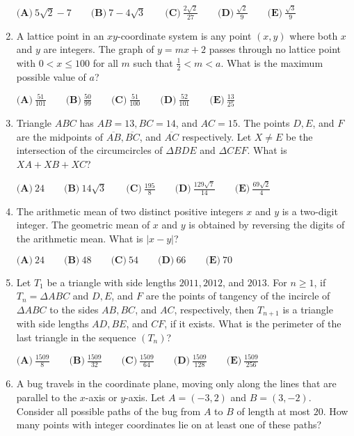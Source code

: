 \documentclass{article}
\begin{document}
\begin{enumerate}[label=\arabic*., itemsep=0.5em]
$\textbf{(A)}\ 5\sqrt{2} - 7 \qquad \textbf{(B)}\ 7 - 4\sqrt{3} \qquad \textbf{(C)}\ \frac{2\sqrt{2}}{27} \qquad \textbf{(D)}\ \frac{\sqrt{2}}{9} \qquad \textbf{(E)}\ \frac{\sqrt{3}}{9}$\par \vspace{0.5em}\item A lattice point in an $xy$-coordinate system is any point $(x, y)$ where both $x$ and $y$ are integers. The graph of $y = mx + 2$ passes through no lattice point with $0 < x \leq 100$ for all $m$ such that $\frac{1}{2} < m < a$. What is the maximum possible value of $a$?

$\textbf{(A)}\ \frac{51}{101} \qquad \textbf{(B)}\ \frac{50}{99} \qquad \textbf{(C)}\ \frac{51}{100} \qquad \textbf{(D)}\ \frac{52}{101} \qquad \textbf{(E)}\ \frac{13}{25}$\par \vspace{0.5em}\item Triangle $ABC$ has $AB = 13, BC = 14$, and $AC = 15$. The points $D, E$, and $F$ are the midpoints of $\overline{AB}, \overline{BC}$, and $\overline{AC}$ respectively. Let $X \not= E$ be the intersection of the circumcircles of $\Delta BDE$ and $\Delta CEF$. What is $XA + XB + XC$?

$\textbf{(A)}\ 24 \qquad \textbf{(B)}\ 14\sqrt{3} \qquad \textbf{(C)}\ \frac{195}{8} \qquad \textbf{(D)}\ \frac{129\sqrt{7}}{14} \qquad \textbf{(E)}\ \frac{69\sqrt{2}}{4}$\par \vspace{0.5em}\item The arithmetic mean of two distinct positive integers $x$ and $y$ is a two-digit integer. The geometric mean of $x$ and $y$ is obtained by reversing the digits of the arithmetic mean. What is $|x - y|$?

$\textbf{(A)}\ 24 \qquad \textbf{(B)}\ 48 \qquad \textbf{(C)}\ 54 \qquad \textbf{(D)}\ 66 \qquad \textbf{(E)}\ 70$\par \vspace{0.5em}\item Let $T_1$ be a triangle with side lengths $2011, 2012$, and $2013$. For $n \geq 1$, if $T_n = \Delta ABC$ and $D, E$, and $F$ are the points of tangency of the incircle of $\Delta ABC$ to the sides $AB, BC$, and $AC$, respectively, then $T_{n+1}$ is a triangle with side lengths $AD, BE$, and $CF$, if it exists. What is the perimeter of the last triangle in the sequence $\left(T_n\right)$?

$\textbf{(A)}\ \frac{1509}{8} \qquad \textbf{(B)}\  \frac{1509}{32} \qquad \textbf{(C)}\  \frac{1509}{64} \qquad \textbf{(D)}\  \frac{1509}{128} \qquad \textbf{(E)}\  \frac{1509}{256}$\par \vspace{0.5em}\item A bug travels in the coordinate plane, moving only along the lines that are parallel to the $x$-axis or $y$-axis. Let $A = (-3, 2)$ and $B = (3, -2)$. Consider all possible paths of the bug from $A$ to $B$ of length at most $20$. How many points with integer coordinates lie on at least one of these paths?


\end{enumerate}
\end{document}
